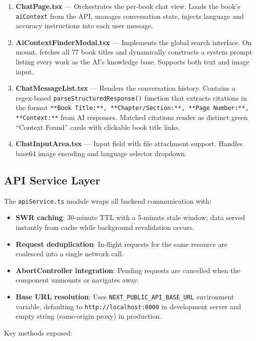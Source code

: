 \documentclass[11pt,a4paper]{article}
\begin{document}
\begin{enumerate}
    \item \textbf{ChatPage.tsx} --- Orchestrates the per-book chat view. Loads the book's \texttt{aiContext} from the API, manages conversation state, injects language and accuracy instructions into each user message.
    \item \textbf{AiContextFinderModal.tsx} --- Implements the global search interface. On mount, fetches all 77 book titles and dynamically constructs a system prompt listing every work as the AI's knowledge base. Supports both text and image input.
    \item \textbf{ChatMessageList.tsx} --- Renders the conversation history. Contains a regex-based \texttt{parseStructuredResponse()} function that extracts citations in the format \texttt{**Book Title:**, **Chapter/Section:**, **Page Number:**, **Context:**} from AI responses. Matched citations render as distinct green ``Context Found'' cards with clickable book title links.
    \item \textbf{ChatInputArea.tsx} --- Input field with file attachment support. Handles base64 image encoding and language selector dropdown.
\end{enumerate}

\subsection{API Service Layer}

The \texttt{apiService.ts} module wraps all backend communication with:

\begin{itemize}
    \item \textbf{SWR caching}: 30-minute TTL with a 5-minute stale window; data served instantly from cache while background revalidation occurs.
    \item \textbf{Request deduplication}: In-flight requests for the same resource are coalesced into a single network call.
    \item \textbf{AbortController integration}: Pending requests are cancelled when the component unmounts or navigates away.
    \item \textbf{Base URL resolution}: Uses \texttt{NEXT\_PUBLIC\_API\_BASE\_URL} environment variable, defaulting to \texttt{http://localhost:8000} in development server and empty string (same-origin proxy) in production.
\end{itemize}

Key methods exposed:
\end{document}
